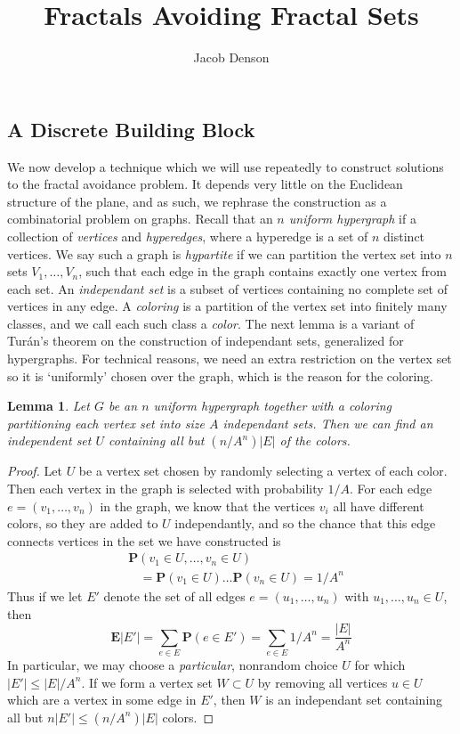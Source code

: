 \documentclass{article}
\title{Fractals Avoiding Fractal Sets}
\author{Jacob Denson}
\theoremstyle{plain}
\newtheorem{lemma}{Lemma}
\theoremstyle{plain}
\begin{document}
\maketitle

\begin{multicols}{2}

\section{A Discrete Building Block}

We now develop a technique which we will use repeatedly to construct solutions to the fractal avoidance problem. It depends very little on the Euclidean structure of the plane, and as such, we rephrase the construction as a combinatorial problem on graphs. Recall that an {\it $n$ uniform hypergraph} if a collection of {\it vertices} and {\it hyperedges}, where a hyperedge is a set of $n$ distinct vertices. We say such a graph is {\it hypartite} if we can partition the vertex set into $n$ sets $V_1, \dots, V_n$, such that each edge in the graph contains exactly one vertex from each set. An {\it independant set} is a subset of vertices containing no complete set of vertices in any edge. A {\it coloring} is a partition of the vertex set into finitely many classes, and we call each such class a {\it color}. The next lemma is a variant of Tur\'{a}n's theorem on the construction of independant sets, generalized for hypergraphs. For technical reasons, we need an extra restriction on the vertex set so it is `uniformly' chosen over the graph, which is the reason for the coloring.

\begin{lemma}
	Let $G$ be an $n$ uniform hypergraph together with a coloring partitioning each vertex set into size $A$ independant sets. Then we can find an independent set $U$ containing all but $(n/A^n)|E|$ of the colors.
\end{lemma}
\begin{proof}
	Let $U$ be a vertex set chosen by randomly selecting a vertex of each color. Then each vertex in the graph is selected with probability $1/A$. For each edge $e = (v_1, \dots, v_n)$ in the graph, we know that the vertices $v_i$ all have different colors, so they are added to $U$ independantly, and so the chance that this edge connects vertices in the set we have constructed is
	\begin{align*}
		&\mathbf{P}(v_1 \in U, \dots, v_n \in U)\\
		&\ \ \ \ = \mathbf{P}(v_1 \in U) \dots \mathbf{P}(v_n \in U) = 1/A^n
	\end{align*}
	Thus if we let $E'$ denote the set of all edges $e = (u_1, \dots, u_n)$ with $u_1, \dots, u_n \in U$, then
	\[ \mathbf{E}|E'| = \sum_{e \in E} \mathbf{P}(e \in E') = \sum_{e \in E} 1/A^n = \frac{|E|}{A^n} \]
	In particular, we may choose a {\it particular}, nonrandom choice $U$ for which $|E'| \leq |E|/A^n$. If we form a vertex set $W \subset U$ by removing all vertices $u \in U$ which are a vertex in some edge in $E'$, then $W$ is an independant set containing all but $n |E'| \leq (n/A^n) |E|$ colors.
\end{proof}


\end{multicols}
\end{document}
